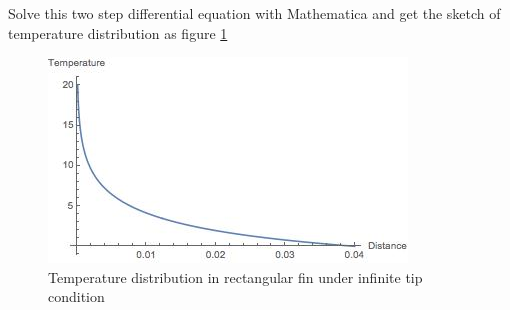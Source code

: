 \begin{solution}
\begin{enumerate}
Solve this two step differential equation with Mathematica and get the sketch of temperature distribution as figure \ref{fig:2:18}
\begin{figure}[h!]
  \centering
    \includegraphics[scale=1]{figures/ch2/18}
    \caption{Temperature distribution in rectangular fin under infinite tip condition}
    \label{fig:2:18}
\end{figure}
\end{enumerate}
\end{solution}












